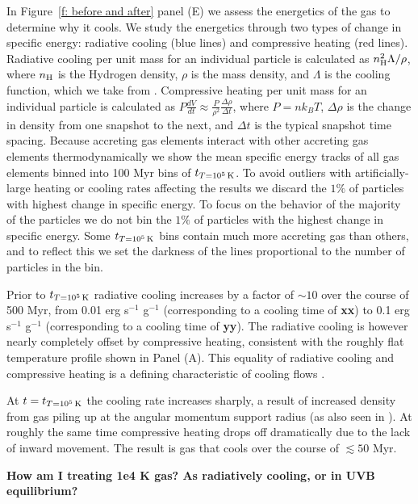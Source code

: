 \documentclass[fleqn,usenatbib]{mnras}
\newcommand{\tcon}{t_{T=10^5\,{\rm K}}}
\newcommand{\nH}{n_{\rm H}}
\begin{document}
In Figure~\ref{f: before and after} panel (E) we assess the energetics of the gas to determine why it cools.
We study the energetics through two types of change in specific energy: radiative cooling (blue lines) and compressive heating (red lines).
Radiative cooling per unit mass for an individual particle is calculated as $\nH^2 \Lambda / \rho$, where $\nH$ is the Hydrogen density, $\rho$ is the mass density, and $\Lambda$ is the cooling function, which we take from \cite{Wiersma2009a}.
Compressive heating per unit mass for an individual particle is calculated as $P \frac{dV}{dt} \approx \frac{ P }{ \rho^2 } \frac{ \Delta \rho }{ \Delta t }$, where $P = n k_B T$, $\Delta \rho$ is the change in density from one snapshot to the next, and $\Delta t$ is the typical snapshot time spacing.
Because accreting gas elements interact with other accreting gas elements thermodynamically we show the mean specific energy tracks of all gas elements binned into 100 Myr bins of $\tcon$.
To avoid outliers with artificially-large heating or cooling rates affecting the results we discard the $1\%$ of particles with highest change in specific energy.
To focus on the behavior of the majority of the particles we do not bin the $1\%$ of particles with the highest change in specific energy.
Some $\tcon$ bins contain much more accreting gas than others, and to reflect this we set the darkness of the lines proportional to the number of particles in the bin.

Prior to $\tcon$ radiative cooling increases by a factor of $\sim 10$ over the course of 500 Myr, from 0.01 erg s$^{-1}$ g$^{-1}$ (corresponding to a cooling time of \textbf{xx}) to 0.1 erg s$^{-1}$ g$^{-1}$ (corresponding to a cooling time of \textbf{yy}).
The radiative cooling is however nearly completely offset by compressive heating, consistent with the roughly flat temperature profile shown in Panel (A).
This equality of radiative cooling and compressive heating is a defining characteristic of cooling flows \citep{Mathews78, McNamara2007, Stern2020}. 

At $t=\tcon$ the cooling rate increases sharply, a result of increased density from gas piling up at the angular momentum support radius (as also seen in \citealt{Trapp2021}).
At roughly the same time compressive heating drops off dramatically due to the lack of inward movement.
The result is gas that cools over the course of $\lesssim 50$ Myr.

\textbf{
How am I treating 1e4 K gas?
As radiatively cooling, or in UVB equilibrium?
}
\end{document}
